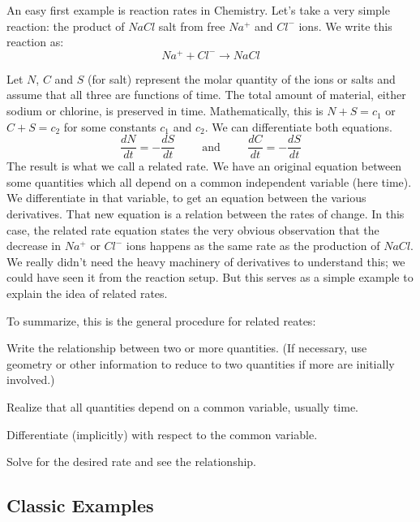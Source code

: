 \documentclass[fleqn]{report}
\begin{document}
\begin{example}
An easy first example is reaction rates in Chemistry. Let's
take a very simple reaction: the product of $NaCl$ salt from
free $Na^+$ and $Cl^-$ ions. We write this reaction as:
\begin{equation*}
Na^+ + Cl^- \rightarrow NaCl
\end{equation*}

Let $N$, $C$ and $S$ (for salt) represent the molar quantity
of the ions or salts and assume that all three are functions
of time. The total amount of material, either sodium or
chlorine, is preserved in time. Mathematically, this is $N + S
= c_1$ or $C + S = c_2$ for some constants $c_1$ and $c_2$.
We can differentiate both equations.
\begin{equation*}
\frac{dN}{dt} = - \frac{dS}{dt} \hspace{1cm} \text{and}
\hspace{1cm} 
\frac{dC}{dt} = - \frac{dS}{dt}
\end{equation*}
The result is what we call a related rate. We have an
original equation between some quantities which all depend on
a common independent variable (here time). We differentiate
in that variable, to get an equation between the various
derivatives. That new equation is a relation between the
rates of change. In this case, the related rate equation
states the very obvious observation that the decrease in $Na^+$ or
$Cl^-$ ions happens as the same rate as the production of
$NaCl$. We really didn't need the heavy machinery of
derivatives to understand this; we could have seen it from the
reaction setup. But this serves as a simple example to
explain the idea of related rates.
\end{example}

To summarize, this is the general procedure for related reates:
\begin{smallparts}
\item Write the relationship between two or more quantities.
(If necessary, use geometry or other information to reduce to
two quantities if more are initially involved.)
\item Realize that all quantities depend on a common variable,
usually time.
\item Differentiate (implicitly) with respect to the common
variable.
\item Solve for the desired rate and see the relationship. 
\end{smallparts}

\subsection{Classic Examples}
\label{classic-examples}
\end{document}
